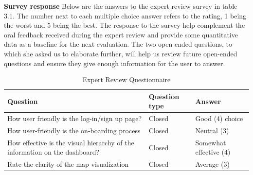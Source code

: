 \textbf{Survey response}
Below are the answers to the expert review survey in table 3.1. The number next to each multiple choice answer refers to the rating, 1 being the worst and 5 being the best. The response to the survey help complement the oral feedback received during the expert review and provide some quantitative data as a baseline for the next evaluation. The two open-ended questions, to which she asked us to elaborate further, will help us review future open-ended questions and ensure they give enough information for the user to answer.
\begin{table}[h!]
    \centering
    \caption{Expert Review Questionnaire}
    \begin{tabular}{|p{}|p{}|p{}|}
        \hline
        \textbf{Question}                                                                                                        & \textbf{Question type} & \textbf{Answer}                                                                                                                                                                                                       \\
        \hline
        How user friendly is the log-in/sign up page?                                                                            & Closed                 & Good (4) choice                                                                                                                                                                                                       \\
        \hline
        How user-friendly is the on-boarding process                                                                             & Closed                 & Neutral (3)                                                                                                                                                                                                           \\
        \hline
        How effective is the visual hierarchy of the information on the dashboard?                                               & Closed                 & Somewhat effective (4)                                                                                                                                                                                                \\
        \hline
        Rate the clarity of the map visualization                                                                                & Closed                 & Average (3)                                                                                                                                                                                                           \\

\end{tabular}
\end{table}
